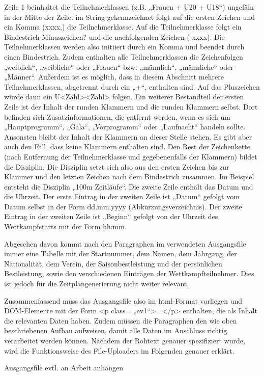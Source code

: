 Zeile 1 beinhaltet die Teilnehmerklassen (z.B. „Frauen + U20 + U18“) ungefähr in der Mitte der Zeile. im String gekennzeichnet folgt auf die ersten Zeichen und ein Komma (xxxx,) die Teilnehmerklasse. Auf die Teilnehmerklasse folgt ein Bindestrich Minuszeichen? und die nachfolgenden Zeichen (-xxxx). Die Teilnehmerklassen werden also initiiert durch ein Komma und beendet durch einen Bindestrich. Zudem enthalten alle Teilnehmerklassen die Zeichenfolgen „weiblich“, „weibliche“ oder „Frauen“ bzw. „männlich“, „männliche“ oder „Männer“. Außerdem ist es möglich, dass in diesem Abschnitt mehrere Teilnehmerklassen, abgetrennt durch ein „+“, enthalten sind. Auf das Pluszeichen würde dann ein U<Zahl><Zahl> folgen. Ein weiterer Bestandteil der ersten Zeile ist der Inhalt der runden Klammern und die runden Klammern selbst. Dort befinden sich Zusatzinformationen, die entfernt werden, wenn es sich um „Hauptprogramm“, „Gala“, „Vorprogramm“ oder „Laufnacht“ handeln sollte. Ansonsten bleibt der Inhalt der Klammern an dieser Stelle stehen. Es gibt aber auch den Fall, dass keine Klammern enthalten sind. Den Rest der Zeichenkette (nach Entfernung der Teilnehmerklasse und gegebenenfalls der Klammern) bildet die Disziplin. Die Disziplin setzt sich also aus den ersten Zeichen bis zur Klammer und den letzten Zeichen nach dem Bindestrich zusammen. Im Beispiel entsteht die Disziplin „100m Zeitläufe“.
Die zweite Zeile enthält das Datum und die Uhrzeit. Der erste Eintrag in der zweiten Zeile ist „Datum“ gefolgt vom Datum selbst in der Form dd.mm.yyyy (Abkürzungsverzeichnis). Der zweite Eintrag in der zweiten Zeile ist „Beginn“ gefolgt von der Uhrzeit des Wettkampfstarts mit der Form hh:mm.

Abgesehen davon kommt nach den Paragraphen im verwendeten Ausgangsfile immer eine Tabelle mit der Startnummer, dem Namen, dem Jahrgang, der Nationalität, dem Verein, der Saisonbestleistung und der persönlichen Bestleistung, sowie den verschiedenen Einträgen der Wettkampfteilnehmer. Dies ist jedoch für die Zeitplangenerierung nicht weiter relevant.

Zusammenfassend muss das Ausgangsfile also im html-Format vorliegen und DOM-Elemente mit der Form <p class= „ev1“>...</p> enthalten, die als Inhalt die relevanten Daten haben. Zudem müssen die Paragraphen den wie oben beschriebenen Aufbau aufweisen, damit alle Daten im Anschluss richtig verarbeitet werden können. 
Nachdem der Rohtext genauer spezifiziert wurde, wird die Funktionsweise des File-Uploaders im Folgenden genauer erklärt.

Ausgangsfile evtl. an Arbeit anhängen 

